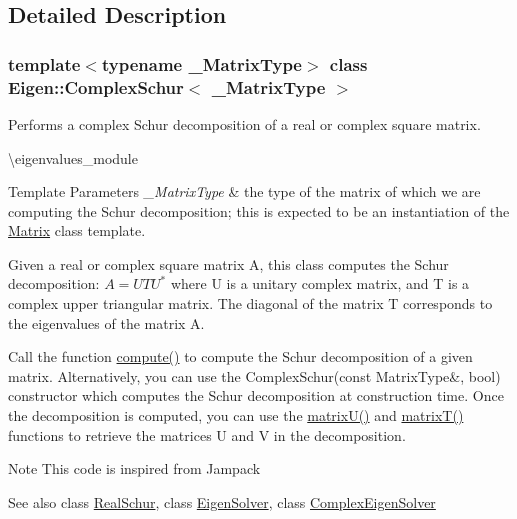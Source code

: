 \subsection{Detailed Description}
\subsubsection*{template$<$typename \+\_\+\+Matrix\+Type$>$\newline
class Eigen\+::\+Complex\+Schur$<$ \+\_\+\+Matrix\+Type $>$}

Performs a complex Schur decomposition of a real or complex square matrix. 

\textbackslash{}eigenvalues\+\_\+module


\begin{DoxyTemplParams}{Template Parameters}
{\em \+\_\+\+Matrix\+Type} & the type of the matrix of which we are computing the Schur decomposition; this is expected to be an instantiation of the \mbox{\hyperlink{class_eigen_1_1_matrix}{Matrix}} class template.\\
\hline
\end{DoxyTemplParams}
Given a real or complex square matrix A, this class computes the Schur decomposition\+: $ A = U T U^*$ where U is a unitary complex matrix, and T is a complex upper triangular matrix. The diagonal of the matrix T corresponds to the eigenvalues of the matrix A.

Call the function \mbox{\hyperlink{class_eigen_1_1_complex_schur_a3543d2c286563108cd9ace672bbb1c09}{compute()}} to compute the Schur decomposition of a given matrix. Alternatively, you can use the Complex\+Schur(const Matrix\+Type\&, bool) constructor which computes the Schur decomposition at construction time. Once the decomposition is computed, you can use the \mbox{\hyperlink{class_eigen_1_1_complex_schur_afed8177cf9836f032d42bdb6c6bc6e01}{matrix\+U()}} and \mbox{\hyperlink{class_eigen_1_1_complex_schur_add3ab5ed83f7f2f06b79fa910a2d5684}{matrix\+T()}} functions to retrieve the matrices U and V in the decomposition.

\begin{DoxyNote}{Note}
This code is inspired from Jampack
\end{DoxyNote}
\begin{DoxySeeAlso}{See also}
class \mbox{\hyperlink{class_eigen_1_1_real_schur}{Real\+Schur}}, class \mbox{\hyperlink{class_eigen_1_1_eigen_solver}{Eigen\+Solver}}, class \mbox{\hyperlink{class_eigen_1_1_complex_eigen_solver}{Complex\+Eigen\+Solver}} 
\end{DoxySeeAlso}


